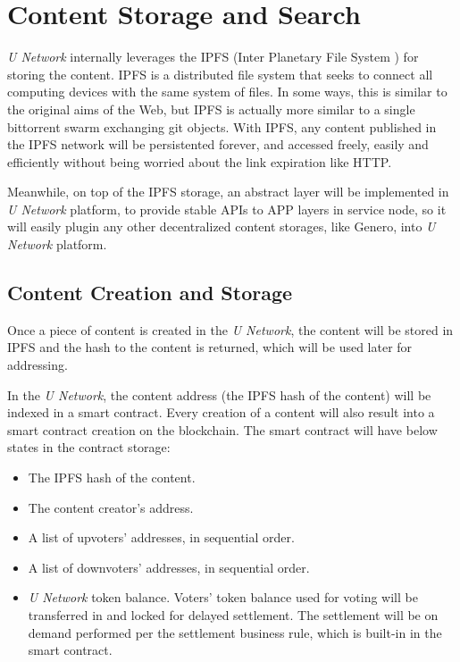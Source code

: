 \section{Content Storage and Search}
\emph{U Network} internally leverages the IPFS (Inter Planetary File System \cite{ipfs}) for storing the content. IPFS is a distributed file system that seeks to connect all computing devices with the same system of files. In some ways, this is similar to the original aims of the Web, but IPFS is actually more similar to a single bittorrent swarm exchanging git objects. With IPFS, any content published in the IPFS network will be persistented forever, and accessed freely, easily and efficiently without being worried about the link expiration like HTTP. 

Meanwhile, on top of the IPFS storage, an abstract layer will be implemented in \emph{U Network} platform, to provide stable APIs to APP layers in service node, so it will easily plugin any other decentralized content storages, like Genero, into \emph{U Network} platform.

\subsection{Content Creation and Storage}
Once a piece of content is created in the \emph{U Network}, the content will be stored in IPFS and the hash to the content is returned, which will be used later for addressing. 

In the \emph{U Network}, the content address (the IPFS hash of the content) will be indexed in a smart contract. Every creation of a content will also result into a smart contract creation on the blockchain. The smart contract will have below states in the contract storage:
\begin{itemize}
\item The IPFS hash of the content.
\item The content creator's address. 
\item A list of upvoters' addresses, in sequential order.
\item A list of downvoters' addresses, in sequential order.
\item \emph{U Network} token balance. Voters' token balance used for voting will be transferred in and locked for delayed settlement. The settlement will be on demand performed per the settlement business rule, which is built-in in the smart contract.
\end{itemize}

